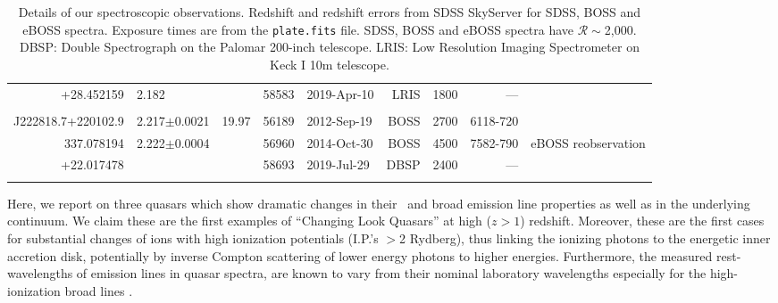\documentclass[a4paper,fleqn,usenatbib]{mnras}
\begin{document}
\begin{table}
\begin{tabular}{r l   r ll   r r r r}
    +28.452159                 &  2.182                           &                          &  58583    & 2019-Apr-10     & LRIS              &  1800                   &  ---                             & \\
                                        &                                      &                          &                &                            &                    &                              &                                & \\
    J222818.7+220102.9   & 2.217$\pm$0.0021      & 19.97                &  56189    & 2012-Sep-19     & BOSS             &  2700                 &   6118-720          & \\
    337.078194                 & 2.222$\pm$0.0004      &                          &  56960    & 2014-Oct-30     & BOSS             &  4500                  &   7582-790          & eBOSS reobservation \\ 
    +22.017478                &                                      &                          &  58693    & 2019-Jul-29       & DBSP             & 2400                   &    ---                        &    \\
                                       &                                       &                          &               &                            &                   &                              &                            & \\
    \hline \hline   
  \end{tabular}
  \caption{
    Details of our spectroscopic observations.
    Redshift and redshift errors from SDSS SkyServer for SDSS, BOSS and eBOSS spectra. 
    Exposure times are from the {\tt plate.fits} file.  SDSS, BOSS and  eBOSS spectra have $\mathcal{R}\sim$2,000.
    DBSP: Double Spectrograph on the Palomar 200-inch telescope.
    LRIS:  Low Resolution Imaging Spectrometer on Keck I 10m telescope.
  } 
  \label{tab:obs_notes}
\end{table}

Here, we report on three quasars  
which show dramatic changes in their \civ\ and \ciii broad emission
line properties as well as in the underlying continuum. We claim these
are the first examples of ``Changing Look Quasars'' at high ($z>1$)
redshift. Moreover, these are the first cases for substantial changes
of ions with high ionization potentials (I.P.'s $>$2 Rydberg), thus
linking the ionizing photons to the energetic inner accretion disk,
potentially by inverse Compton scattering of lower energy photons to
higher energies.  Furthermore, the measured rest-wavelengths of
emission lines in quasar spectra, are known to vary from their nominal
laboratory wavelengths especially for the high-ionization broad lines \citep[e.g.][]{VandenBerk2001}.
\end{document}
